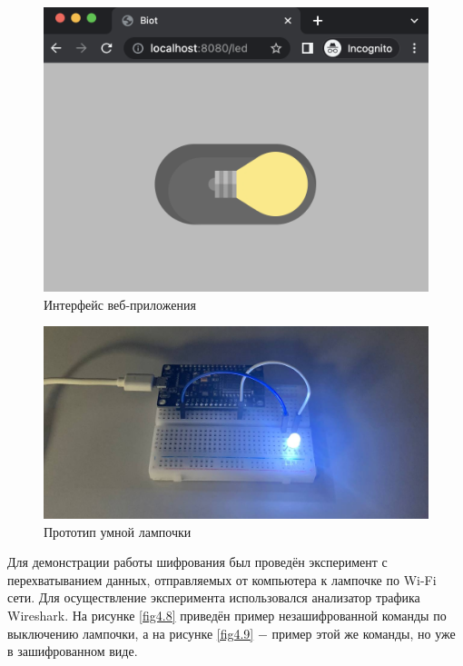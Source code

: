 	\begin{figure}[h]
		\centering
		\includegraphics[scale=0.7]{resources/client-light-on}
		\caption{Интерфейс веб-приложения}
		\label{fig4.6}
	\end{figure}
	
	\begin{figure}[h]
		\centering
		\includegraphics[scale=0.3]{resources/device-prototype}
		\caption{Прототип умной лампочки}
		\label{fig4.7}
	\end{figure}

	Для демонстрации работы шифрования был проведён эксперимент с перехватыванием данных, отправляемых
	от компьютера к лампочке по Wi-Fi сети. Для осуществление эксперимента использовался анализатор трафика
	Wireshark. На рисунке \ref{fig4.8} приведён пример незашифрованной команды по выключению лампочки,
	а на рисунке \ref{fig4.9} $-$ пример этой же команды, но уже в зашифрованном виде.
	
